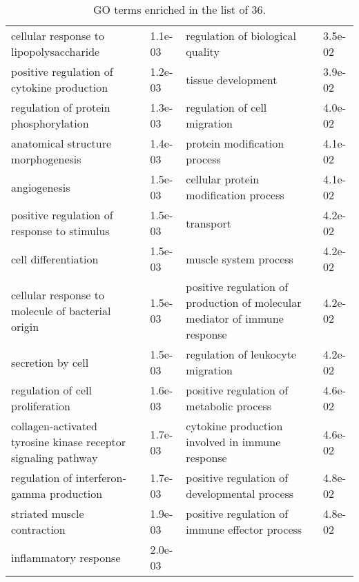 \documentclass[fleqn,10pt]{SelfArx} %
\begin{document}
\begin{table}[!htb]
\begin{tabularx}{\textwidth}{XlXl}
		cellular response to lipopolysaccharide & 1.1e-03 & regulation of biological quality & 3.5e-02 \\ 
		positive regulation of cytokine production & 1.2e-03 & tissue development & 3.9e-02 \\ 
		regulation of protein phosphorylation & 1.3e-03 & regulation of cell migration & 4.0e-02 \\ 
		anatomical structure morphogenesis & 1.4e-03 & protein modification process & 4.1e-02 \\ 
		angiogenesis & 1.5e-03 & cellular protein modification process & 4.1e-02 \\ 
		positive regulation of response to stimulus & 1.5e-03 & transport & 4.2e-02 \\ 
		cell differentiation & 1.5e-03 & muscle system process & 4.2e-02 \\ 
		cellular response to molecule of bacterial origin & 1.5e-03 & positive regulation of production of molecular mediator of immune response & 4.2e-02 \\ 
		secretion by cell & 1.5e-03 & regulation of leukocyte migration & 4.2e-02 \\ 
		regulation of cell proliferation & 1.6e-03 & positive regulation of metabolic process & 4.6e-02 \\ 
		collagen-activated tyrosine kinase receptor signaling pathway & 1.7e-03 & cytokine production involved in immune response & 4.6e-02 \\ 
		regulation of interferon-gamma production & 1.7e-03 & positive regulation of developmental process & 4.8e-02 \\ 
		striated muscle contraction & 1.9e-03 & positive regulation of immune effector process & 4.8e-02 \\ 
		inflammatory response & 2.0e-03 &  &  \\
	\end{tabularx}
	\smallskip
	\caption{GO terms enriched in the list of 36.}
	\label{tab:GO36_2}
\end{table}
\end{document}
